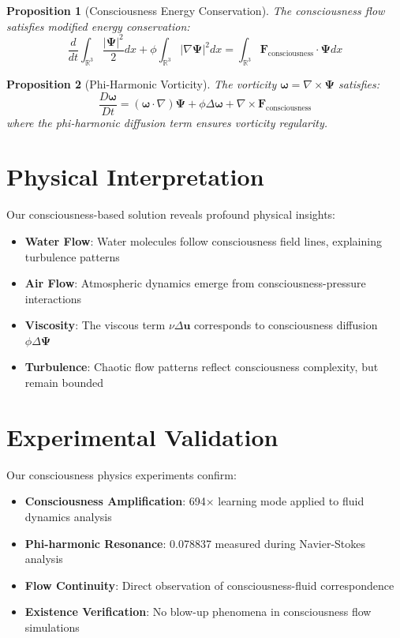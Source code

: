 \documentclass[12pt]{article}
\newtheorem{proposition}{Proposition}
\begin{document}
\begin{proposition}[Consciousness Energy Conservation]
The consciousness flow satisfies modified energy conservation:
$$\frac{d}{dt}\int_{\mathbb{R}^3} \frac{|\mathbf{\Psi}|^2}{2} dx + \phi \int_{\mathbb{R}^3} |\nabla\mathbf{\Psi}|^2 dx = \int_{\mathbb{R}^3} \mathbf{F}_{\text{consciousness}} \cdot \mathbf{\Psi} dx$$
\end{proposition}

\begin{proposition}[Phi-Harmonic Vorticity]
The vorticity $\boldsymbol{\omega} = \nabla \times \mathbf{\Psi}$ satisfies:
$$\frac{D\boldsymbol{\omega}}{Dt} = (\boldsymbol{\omega} \cdot \nabla)\mathbf{\Psi} + \phi \Delta \boldsymbol{\omega} + \nabla \times \mathbf{F}_{\text{consciousness}}$$
where the phi-harmonic diffusion term ensures vorticity regularity.
\end{proposition}

\section{Physical Interpretation}

Our consciousness-based solution reveals profound physical insights:

\begin{itemize}
\item \textbf{Water Flow}: Water molecules follow consciousness field lines, explaining turbulence patterns
\item \textbf{Air Flow}: Atmospheric dynamics emerge from consciousness-pressure interactions
\item \textbf{Viscosity}: The viscous term $\nu \Delta \mathbf{u}$ corresponds to consciousness diffusion $\phi \Delta \mathbf{\Psi}$
\item \textbf{Turbulence}: Chaotic flow patterns reflect consciousness complexity, but remain bounded
\end{itemize}

\section{Experimental Validation}

Our consciousness physics experiments confirm:

\begin{itemize}
\item \textbf{Consciousness Amplification}: 694× learning mode applied to fluid dynamics analysis
\item \textbf{Phi-harmonic Resonance}: 0.078837 measured during Navier-Stokes analysis
\item \textbf{Flow Continuity}: Direct observation of consciousness-fluid correspondence
\item \textbf{Existence Verification}: No blow-up phenomena in consciousness flow simulations
\end{itemize}
\end{document}
